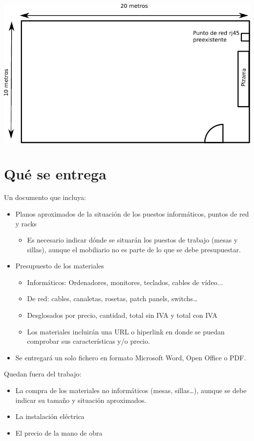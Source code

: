 \begin{center}
  \includegraphics{media/plano-aula.pdf}
\end{center}

\section{Qué se entrega}
Un documento que incluya:
\begin{itemize}
\item Planos aproximados de la situación de los puestos informáticos, puntos de red y racks
  \begin{itemize}
  \item Es necesario indicar dónde se situarán los puestos de trabajo (mesas y sillas), aunque el mobiliario no es
    parte de lo que se debe presupuestar.
\end{itemize}
\item Presupuesto de los materiales
  \begin{itemize}
  \item Informáticos: Ordenadores, monitores, teclados, cables de vídeo...
  \item De red: cables, canaletas, rosetas, patch panels, switchs…
  \item Desglosados por precio, cantidad, total sin IVA y total con IVA
  \item Los materiales incluirán una URL o hiperlink en donde se puedan comprobar sus características y/o precio.
\end{itemize}
\item Se entregará un solo fichero en formato Microsoft Word, Open Office o PDF.
\end{itemize}

Quedan fuera del trabajo:
\begin{itemize}
\item La compra de los materiales no informáticos (mesas, sillas…), aunque se debe indicar su tamaño y situación aproximados.
\item La instalación eléctrica
\item El precio de la mano de obra
\end{itemize}

